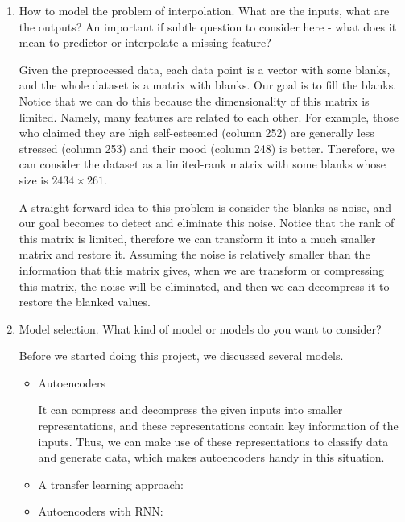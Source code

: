 \documentclass[11pt, a4paper]{article}
\makeatletter
\def\namedlabel#1#2{\begingroup
	\def\@currentlabel{#2}%
	\phantomsection\label{#1}\endgroup
}
\makeatother
\begin{document}
\begin{enumerate}
	\item{How to model the problem of interpolation. What are the inputs, what are the outputs? An important if subtle question to consider here - what does it mean to predictor or interpolate a missing feature?}
	\namedlabel{interpolation}{Formalization of interpolation}
	\par{Given the preprocessed data, each data point is a vector with some blanks, and the whole dataset is a matrix with blanks. Our goal is to fill the blanks. Notice that we can do this because the dimensionality of this matrix is limited. Namely, many features are related to each other. For example, those who claimed they are high self-esteemed (column 252) are generally less stressed (column 253) and their mood (column 248) is better. Therefore, we can consider the dataset as a limited-rank matrix with some blanks whose size is $2434 \times 261$.}
	\par{A straight forward idea to this problem is consider the blanks as noise, and our goal becomes to detect and eliminate this noise. Notice that the rank of this matrix is limited, therefore we can transform it into a much smaller matrix and restore it. Assuming the noise is relatively smaller than the information that this matrix gives, when we are transform or compressing this matrix, the noise will be eliminated, and then we can decompress it to restore the blanked values.}
	
	\item{Model selection. What kind of model or models do you want to consider?}
	\par{Before we started doing this project, we discussed several models.}
	\begin{itemize}
		\item {Autoencoders}
		\par{It can compress and decompress the given inputs into smaller representations, and these representations contain key information of the inputs. Thus, we can make use of these representations to classify data and generate data, which makes autoencoders handy in this situation.}
		\item {A transfer learning approach:}
		\item {Autoencoders with RNN:}
	\end{itemize}
\end{enumerate}
\end{document}
